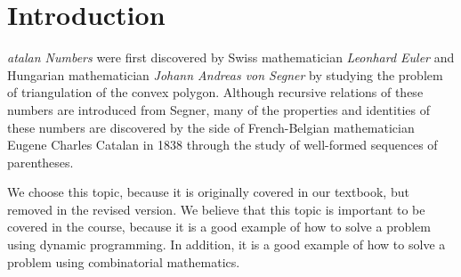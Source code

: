 \newpage
\section{Introduction}
\lettrine[findent=2pt]{}{ }\textit{atalan Numbers} were first discovered by Swiss mathematician \textit{Leonhard Euler} and Hungarian mathematician \textit{Johann Andreas von Segner} by studying the problem of triangulation of the convex polygon\cite{mathshistory}. 
Although recursive relations of these numbers are introduced from Segner, many of the properties and identities of these numbers are discovered by the side of French-Belgian mathematician Eugene Charles Catalan in 1838 through the study of well-formed sequences of parentheses.

We choose this topic, because it is originally covered in our textbook, but removed in the revised version. We believe that this topic is important to be covered in the course, because it is a good example of how to solve a problem using dynamic programming. In addition, it is a good example of how to solve a problem using combinatorial mathematics.